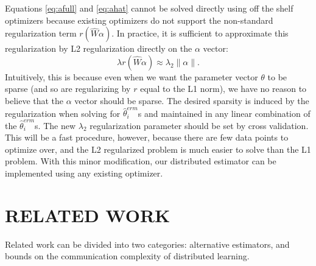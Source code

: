 \documentclass[twoside]{article}
\newcommand{\matW}{\hat W}
\newcommand{\w}{\theta}
\newcommand{\wmle}{\hat\w^{erm}}
\newcommand{\reg}{r}
\newcommand{\ltwo}[1]{{\lVert {#1} \rVert}}
\begin{document}
%
Equations \ref{eq:afull} and \ref{eq:ahat} cannot be solved directly using off the shelf optimizers because existing optimizers do not support the non-standard regularization term $\reg(\matW\alpha)$.
In practice, it is sufficient to approximate this regularization by L2 regularization directly on the $\alpha$ vector:
\begin{equation}
\lambda \reg(\matW\alpha) \approx \lambda_2 \ltwo{\alpha}
.
\label{eq:approxreg}
\end{equation}
Intuitively, this is because even when we want the parameter vector $\w$ to be sparse (and so are regularizing by $\reg$ equal to the L1 norm), we have no reason to believe that the $\alpha$ vector should be sparse.
The desired sparsity is induced by the regularization when solving for $\wmle_i$s and maintained in any linear combination of the $\wmle_i$s.
The new $\lambda_2$ regularization parameter should be set by cross validation.
This will be a fast procedure, however, because there are few data points to optimize over,
and the L2 regularized problem is much easier to solve than the L1 problem.
With this minor modification, our distributed estimator can be implemented using any existing optimizer.


\section{RELATED WORK}
\label{sec:relwork}

Related work can be divided into two categories:
alternative estimators,
and bounds on the communication complexity of distributed learning.
\end{document}
